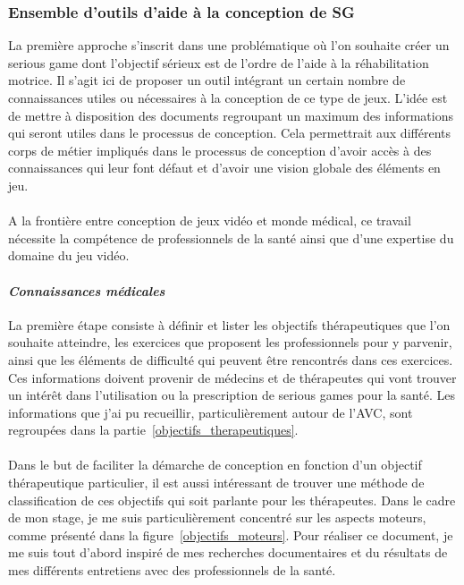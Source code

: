 	\subsubsection{Ensemble d'outils d'aide à la conception de SG} \label{part_outils}
	La première approche s'inscrit dans une problématique où l'on souhaite créer un serious game dont l'objectif sérieux est de l'ordre de l'aide à la réhabilitation motrice. Il s'agit ici de proposer un outil intégrant un certain nombre de connaissances utiles ou nécessaires à la conception de ce type de jeux. L'idée est de mettre à disposition des documents regroupant un maximum des informations qui seront utiles dans le processus de conception. Cela permettrait aux différents corps de métier impliqués dans le processus de conception d'avoir accès à des connaissances qui leur font défaut et d'avoir une vision globale des éléments en jeu.
	
		\paragraph{}
A la frontière entre conception de jeux vidéo et monde médical, ce travail nécessite la compétence de professionnels de la santé ainsi que d’une expertise du domaine du jeu vidéo.
			\paragraph{\emph{Connaissances médicales}\\}
La première étape consiste à définir et lister les objectifs thérapeutiques que l’on souhaite atteindre, les exercices que proposent les professionnels pour y parvenir, ainsi que les éléments de difficulté qui peuvent être rencontrés dans ces exercices. Ces informations doivent provenir de médecins et de thérapeutes qui vont trouver un intérêt dans l’utilisation ou la prescription de serious games pour la santé. Les informations que j'ai pu recueillir, particulièrement autour de l'\gls{AVC}, sont regroupées dans la partie~\ref{objectifs_therapeutiques}.

\paragraph{}
Dans le but de faciliter la démarche de conception en fonction d’un objectif thérapeutique particulier, il est aussi intéressant de trouver une méthode de classification de ces objectifs qui soit parlante pour les thérapeutes. Dans le cadre de mon stage, je me suis particulièrement concentré sur les aspects moteurs, comme présenté dans la figure~\ref{objectifs_moteurs}. Pour réaliser ce document, je me suis tout d'abord inspiré de mes recherches documentaires et du résultats de mes différents entretiens avec des professionnels de la santé.

